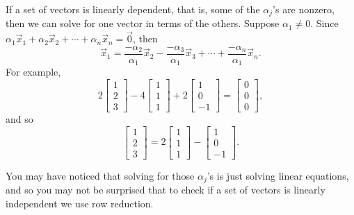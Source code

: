 If a set of vectors is linearly dependent, that is, some of the $\alpha_j$'s
are nonzero, then we can solve for one vector in terms of the others.
Suppose $\alpha_1 \not= 0$.  Since
$\alpha_1 \vec{x}_1 + 
\alpha_2 \vec{x}_2 + 
\cdots +
\alpha_n \vec{x}_n 
=
\vec{0}$, then
\begin{equation*}
\vec{x}_1 
=
\frac{-\alpha_2}{\alpha_1}
\vec{x}_2 - 
\frac{-\alpha_3}{\alpha_1}
\vec{x}_3 + 
\cdots +
\frac{-\alpha_n}{\alpha_1}
\vec{x}_n .
\end{equation*}
For example,
\begin{equation*}
2
\begin{bmatrix} 1 \\ 2 \\ 3 \end{bmatrix}
-4
\begin{bmatrix} 1 \\ 1 \\ 1 \end{bmatrix}
+
2 \begin{bmatrix} 1 \\ 0 \\ -1 \end{bmatrix}
=
\begin{bmatrix} 0 \\ 0 \\ 0 \end{bmatrix} ,
\end{equation*}
and so
\begin{equation*}
\begin{bmatrix} 1 \\ 2 \\ 3 \end{bmatrix}
=
2
\begin{bmatrix} 1 \\ 1 \\ 1 \end{bmatrix}
-
\begin{bmatrix} 1 \\ 0 \\ -1 \end{bmatrix} .
\end{equation*}

You may have noticed that solving for those $\alpha_j$'s is just solving
linear equations, and so you may not be surprised that to check
if a set of vectors is linearly independent we use row reduction.

